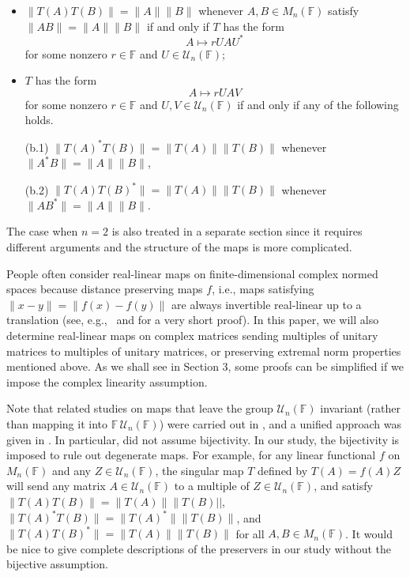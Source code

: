 \documentclass[11pt]{article}
\numberwithin{equation}{section}
\def\IF{{\mathbb F}}
\begin{document}
\begin{itemize}
\item[(a)]  $\|T(A) T(B)\| = \|A\| \|B\|$ whenever  $A, B \in M_n(\IF)$ satisfy
$\|AB\| = \|A\| \|B\|$ if and only if $T$ has the form
$$A \mapsto r UAU^* $$
for some nonzero $r \in \IF$ and $U \in {\mathcal U}_n(\IF)$;
\item[(b)] $T$ has the form
$$A \mapsto r UAV  $$
for some nonzero $r \in \IF$ and $U, V \in {\mathcal U}_n(\IF)$ if and only if any of the following holds.

\smallskip
(b.1) $\|T(A)^*T(B)\| = \|T(A)\| \|T(B)\|$ whenever $\|A^*B\| = \|A\| \|B\|$,

\smallskip
(b.2)   $\|T(A)T(B)^*\| = \|T(A)\| \|T(B)\|$ whenever $\|AB^*\| = \|A\| \|B\|$.
\end{itemize}

\medskip
The case when $n = 2$ is also treated in a separate section since it requires different arguments and  the structure of the maps is more complicated.

People often consider real-linear maps on finite-dimensional complex normed spaces
because distance preserving maps
$f$, i.e., maps satisfying $\|x-y\| = \| f(x)-f(y)\|$ are always
invertible real-linear up to a translation (see, e.g.,~\cite[p.~500] {BhatiaSemrl1997} and \cite{Nica2012} for a very short proof).
In this paper, we will also  determine real-linear maps on complex matrices sending multiples of unitary matrices to
multiples of unitary matrices, or preserving extremal norm properties mentioned above. As we shall see
in Section 3, some proofs can be simplified
if we impose the complex linearity assumption.


Note that related studies on maps that leave the group ${\mathcal U}_n(\IF)$ invariant (rather than mapping it into
$\IF\,{\mathcal U}_n(\IF)$) were carried out in
\cite{Marcus1959, Wei1975}, and a unified approach was given in \cite{BottaPierce1977}.
In particular, \cite{Marcus1959, Wei1975} did not assume bijectivity. In our study, 
the bijectivity is imposed to rule out degenerate maps.   For example,
for any linear functional $f$ on $M_n(\IF)$ and any  $Z \in {\mathcal U}_n(\IF)$,
the singular map $T$ defined by $T(A) = f(A) Z$ will send any matrix  $A \in {\mathcal U}_n(\IF)$ to a multiple of
$Z \in {\mathcal U}_n(\IF)$,
and satisfy
$\|T(A)T(B)\| = \|T(A)\| \|T(B)||$, \ $\|T(A)^* T(B)\| = \|T(A)^*\| \|T(B)\|$,  and $\|T(A) T(B)^*\| = \|T(A)\| \|T(B)\|$
for all $A, B \in M_n(\IF)$. It would be nice to give complete descriptions of the preservers in our study without the 
bijective assumption.
\end{document}
